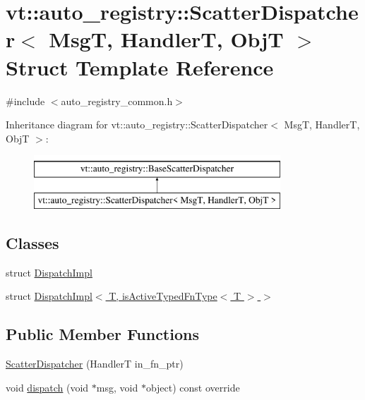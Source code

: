 \hypertarget{structvt_1_1auto__registry_1_1_scatter_dispatcher}{}\section{vt\+:\+:auto\+\_\+registry\+:\+:Scatter\+Dispatcher$<$ MsgT, HandlerT, ObjT $>$ Struct Template Reference}
\label{structvt_1_1auto__registry_1_1_scatter_dispatcher}


{\ttfamily \#include $<$auto\+\_\+registry\+\_\+common.\+h$>$}

Inheritance diagram for vt\+:\+:auto\+\_\+registry\+:\+:Scatter\+Dispatcher$<$ MsgT, HandlerT, ObjT $>$\+:\begin{figure}[H]
\begin{center}
\leavevmode
\includegraphics[height=2.000000cm]{structvt_1_1auto__registry_1_1_scatter_dispatcher}
\end{center}
\end{figure}
\subsection*{Classes}
\begin{DoxyCompactItemize}
\item 
struct \hyperlink{structvt_1_1auto__registry_1_1_scatter_dispatcher_1_1_dispatch_impl}{Dispatch\+Impl}
\item 
struct \hyperlink{structvt_1_1auto__registry_1_1_scatter_dispatcher_1_1_dispatch_impl_3_01_t_00_01is_active_typed_fn_type_3_01_t_01_4_01_4}{Dispatch\+Impl$<$ T, is\+Active\+Typed\+Fn\+Type$<$ T $>$ $>$}
\end{DoxyCompactItemize}
\subsection*{Public Member Functions}
\begin{DoxyCompactItemize}
\item 
\hyperlink{structvt_1_1auto__registry_1_1_scatter_dispatcher_a1059ed7e28fe51d138a6945593dce385}{Scatter\+Dispatcher} (HandlerT in\+\_\+fn\+\_\+ptr)
\item 
void \hyperlink{structvt_1_1auto__registry_1_1_scatter_dispatcher_af0bc28e159a179b15cd964c187d8c85b}{dispatch} (void $\ast$msg, void $\ast$object) const override
\end{DoxyCompactItemize}
